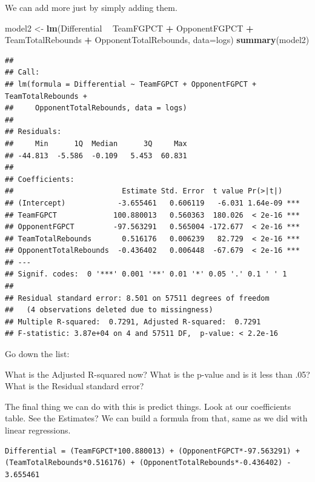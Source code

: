 \documentclass[]{book}
\newenvironment{Shaded}{\begin{snugshade}}{\end{snugshade}}
\newcommand{\DataTypeTok}[1]{\textcolor[rgb]{0.13,0.29,0.53}{#1}}
\newcommand{\KeywordTok}[1]{\textcolor[rgb]{0.13,0.29,0.53}{\textbf{#1}}}
\newcommand{\NormalTok}[1]{#1}
\newcommand{\OperatorTok}[1]{\textcolor[rgb]{0.81,0.36,0.00}{\textbf{#1}}}
\newcommand{\StringTok}[1]{\textcolor[rgb]{0.31,0.60,0.02}{#1}}
\begin{document}
We can add more just by simply adding them.

\begin{Shaded}
\begin{Highlighting}[]
\NormalTok{model2 <-}\StringTok{ }\KeywordTok{lm}\NormalTok{(Differential }\OperatorTok{~}\StringTok{ }\NormalTok{TeamFGPCT }\OperatorTok{+}\StringTok{ }\NormalTok{OpponentFGPCT }\OperatorTok{+}\StringTok{ }\NormalTok{TeamTotalRebounds }\OperatorTok{+}\StringTok{ }\NormalTok{OpponentTotalRebounds, }\DataTypeTok{data=}\NormalTok{logs)}
\KeywordTok{summary}\NormalTok{(model2)}
\end{Highlighting}
\end{Shaded}

\begin{verbatim}
## 
## Call:
## lm(formula = Differential ~ TeamFGPCT + OpponentFGPCT + TeamTotalRebounds + 
##     OpponentTotalRebounds, data = logs)
## 
## Residuals:
##     Min      1Q  Median      3Q     Max 
## -44.813  -5.586  -0.109   5.453  60.831 
## 
## Coefficients:
##                         Estimate Std. Error  t value Pr(>|t|)    
## (Intercept)            -3.655461   0.606119   -6.031 1.64e-09 ***
## TeamFGPCT             100.880013   0.560363  180.026  < 2e-16 ***
## OpponentFGPCT         -97.563291   0.565004 -172.677  < 2e-16 ***
## TeamTotalRebounds       0.516176   0.006239   82.729  < 2e-16 ***
## OpponentTotalRebounds  -0.436402   0.006448  -67.679  < 2e-16 ***
## ---
## Signif. codes:  0 '***' 0.001 '**' 0.01 '*' 0.05 '.' 0.1 ' ' 1
## 
## Residual standard error: 8.501 on 57511 degrees of freedom
##   (4 observations deleted due to missingness)
## Multiple R-squared:  0.7291, Adjusted R-squared:  0.7291 
## F-statistic: 3.87e+04 on 4 and 57511 DF,  p-value: < 2.2e-16
\end{verbatim}

Go down the list:

What is the Adjusted R-squared now?
What is the p-value and is it less than .05?
What is the Residual standard error?

The final thing we can do with this is predict things. Look at our coefficients table. See the Estimates? We can build a formula from that, same as we did with linear regressions.

\begin{verbatim}
Differential = (TeamFGPCT*100.880013) + (OpponentFGPCT*-97.563291) + (TeamTotalRebounds*0.516176) + (OpponentTotalRebounds*-0.436402) - 3.655461
\end{verbatim}
\end{document}
